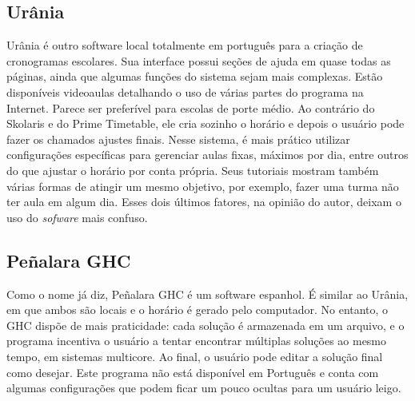 \documentclass[12pt,a4paper]{article}
\begin{document}
		\subsection{Urânia}

			\par Urânia é outro software local totalmente em português para a criação de cronogramas escolares. Sua interface possui seções de ajuda em quase todas as páginas, ainda que algumas funções do sistema sejam mais complexas. Estão disponíveis videoaulas detalhando o uso de várias partes do programa na Internet. Parece ser preferível para escolas de porte médio. Ao contrário do Skolaris e do Prime Timetable, ele cria sozinho o horário e depois o usuário pode fazer os chamados ajustes finais. Nesse sistema, é mais prático utilizar configurações específicas para gerenciar aulas fixas, máximos por dia, entre outros do que ajustar o horário por conta própria. Seus tutoriais mostram também várias formas de atingir um mesmo objetivo, por exemplo, fazer uma turma não ter aula em algum dia. Esses dois últimos fatores, na opinião do autor, deixam o uso do \textit{sofware} mais confuso.

		\subsection{Peñalara GHC}

			\par Como o nome já diz, Peñalara GHC é um software espanhol. É similar ao Urânia, em que ambos são locais e o horário é gerado pelo computador. No entanto, o GHC dispõe de mais praticidade: cada solução é armazenada em um arquivo, e o programa incentiva o usuário a tentar encontrar múltiplas soluções ao mesmo tempo, em sistemas multicore. Ao final, o usuário pode editar a solução final como desejar. Este programa não está disponível em Português e conta com algumas configurações que podem ficar um pouco ocultas para um usuário leigo.

		\vspace{1cm}

\end{document}

